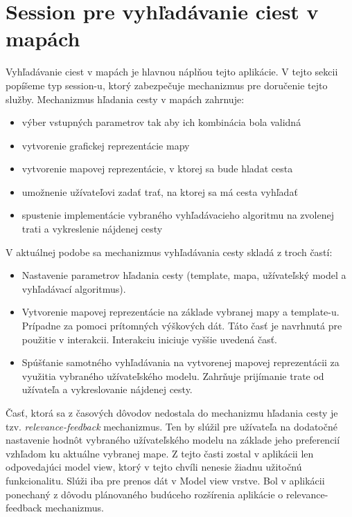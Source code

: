 \section{Session pre vyhľadávanie ciest v mapách}

Vyhľadávanie ciest v mapách je hlavnou náplňou tejto aplikácie. V tejto sekcii popíšeme typ session-u, ktorý zabezpečuje mechanizmus pre doručenie tejto služby. Mechanizmus hľadania cesty v mapách zahrnuje:
\begin{itemize}
    \item výber vstupných parametrov tak aby ich kombinácia bola validná 
    \item vytvorenie grafickej reprezentácie mapy
    \item vytvorenie mapovej reprezentácie, v ktorej sa bude hladat cesta   
    \item umožnenie užívateľovi zadať trať, na ktorej sa má cesta vyhľadať
    \item spustenie implementácie vybraného vyhľadávacieho algoritmu na zvolenej trati a vykreslenie nájdenej cesty 
\end{itemize} 
V aktuálnej podobe sa mechanizmus vyhľadávania cesty skladá z troch častí: 
\begin{itemize}
    \item Nastavenie parametrov hľadania cesty (template, mapa, užívateľský model a vyhľadávací algoritmus).
    \item Vytvorenie mapovej reprezentácie na základe vybranej mapy a template-u. Prípadne za pomoci prítomných výškových dát. Táto časť je navrhnutá pre použitie v interakcii. Interakciu iniciuje vyššie uvedená časť. 
    \item Spúšťanie samotného vyhľadávania na vytvorenej mapovej reprezentácii za využitia vybraného užívateľského modelu. Zahrňuje prijímanie trate od užívateľa a vykreslovanie nájdenej cesty.
\end{itemize} 

Časť, ktorá sa z časových dôvodov nedostala do mechanizmu hľadania cesty je tzv. \textit{relevance-feedback} mechanizmus. Ten by slúžil pre užívateľa na dodatočné nastavenie hodnôt vybraného užívateľského modelu na základe jeho preferencií vzhľadom ku aktuálne vybranej mape. Z tejto časti zostal v aplikácii len odpovedajúci model view, ktorý v tejto chvíli nenesie žiadnu užitočnú funkcionalitu. Slúži iba pre prenos dát v Model view vrstve. Bol v aplikácii ponechaný z dôvodu plánovaného budúceho rozšírenia aplikácie o relevance-feedback mechanizmus.

